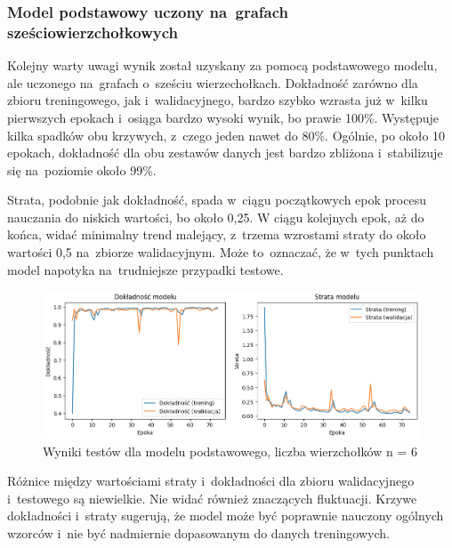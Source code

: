 \subsubsection{Model podstawowy uczony na~grafach sześciowierzchołkowych}

Kolejny warty uwagi wynik został uzyskany za pomocą podstawowego modelu, ale uczonego na~grafach o~sześciu wierzechołkach.
Dokładność zarówno dla zbioru treningowego, jak i~walidacyjnego, bardzo szybko wzrasta już w~kilku pierwszych epokach
i~osiąga bardzo wysoki wynik, bo prawie 100\%.
Występuje kilka spadków obu krzywych, z~czego jeden nawet do 80\%.
Ogólnie, po około 10 epokach, dokładność dla obu zestawów danych jest bardzo zbliżona i~stabilizuje się na~poziomie około 99\%.

Strata, podobnie jak dokładność, spada w~ciągu początkowych epok procesu nauczania do niskich wartości, bo około 0,25.
W ciągu kolejnych epok, aż do końca, widać minimalny trend malejący, z~trzema wzrostami straty do około wartości 0,5 na~zbiorze walidacyjnym.
Może to~oznaczać, że w~tych punktach model napotyka na~trudniejsze przypadki testowe.

\begin{figure}[ht]
	\centering
	\includegraphics[width=15.5cm]{resources/tests/images/v3/base6_img.png}
	\caption{Wyniki testów dla modelu podstawowego, liczba wierzchołków n = 6}
	\label{Fig:tests-base-3a}
\end{figure}
\FloatBarrier

Różnice między wartościami straty i~dokładności dla zbioru walidacyjnego i~testowego są niewielkie.
Nie widać również znaczących fluktuacji.
Krzywe dokładności i~straty sugerują, że model może być poprawnie nauczony ogólnych wzorców
i~nie być nadmiernie dopasowanym do danych treningowych.

